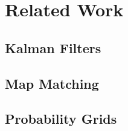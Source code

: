 \section{Related Work}

\subsection{Kalman Filters}

\subsection{Map Matching}

\subsection{Probability Grids}
